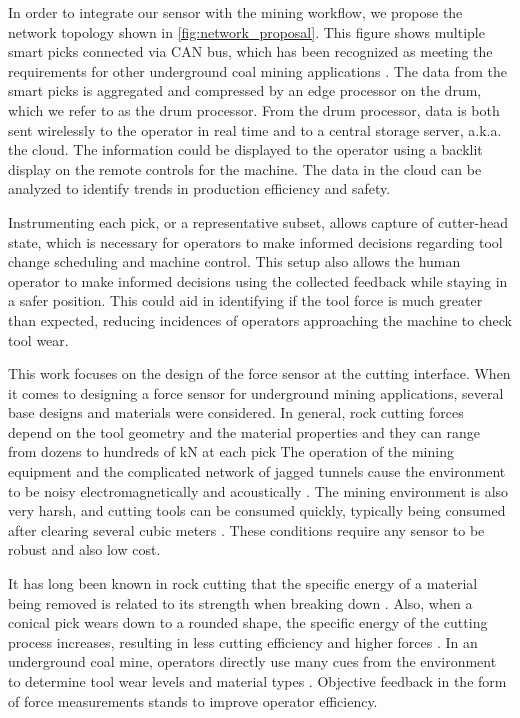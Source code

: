 In order to integrate our sensor with the mining workflow, we propose the network topology 
shown in \ref{fig:network_proposal}. This figure shows multiple smart picks 
connected via CAN bus, which has been recognized as meeting the requirements for 
other underground coal mining applications \cite{Shu2010, Ma2021}. 
The data from the smart picks is aggregated and compressed by an edge processor on the drum,
which we refer to as the drum processor.
From the drum processor, data is both sent wirelessly to the 
operator in real time and to a central storage server, a.k.a. the cloud. 
The information could be displayed to the operator using a backlit display 
on the remote controls for the machine.
The data in the cloud can be analyzed to identify trends in production efficiency and safety. 

Instrumenting each pick, or a representative subset, allows capture of cutter-head state,
which is necessary for operators to make informed decisions 
regarding tool change scheduling and machine control. 
This setup also allows the human operator to make informed decisions using the collected feedback
while staying in a safer position. 
This could aid in identifying if the tool force is much greater than expected,
reducing incidences of operators approaching the machine to check tool wear.

This work focuses on the design of the force sensor at the cutting interface.
When it comes to designing a force sensor for underground mining applications, 
several base designs and materials were considered. 
In general, rock cutting forces depend on the tool geometry and the material properties and
they can range from dozens to hundreds of kN at each pick \cite{Zeng2021, Fan2023, Roxborough1981, Bilgin2006}
The operation of the mining equipment and the complicated network of jagged tunnels cause the 
environment to be noisy electromagnetically and acoustically
\cite{Ikeda2021, Seguel2022, Yarkan2009, Thrybom2015, Ranjan2014}. 
The mining environment is also very harsh, and cutting tools can be consumed quickly, 
typically being consumed after clearing several cubic meters \cite{Hurt1985, Su2020, Rostami2003}.
These conditions require any sensor to be robust and also low cost.

It has long been known in rock cutting that the specific energy of a material being removed 
is related to its strength when breaking down \cite{TEALE196557}.
Also, when a conical pick wears down to a rounded shape, the specific energy of the cutting process
increases, resulting in less cutting efficiency and higher forces \cite{Zeng2021}.
In an underground coal mine, operators directly use many cues 
from the environment to determine tool wear levels and material types \cite{Bartels2009}.
Objective feedback in the form of force measurements stands to improve operator efficiency.


